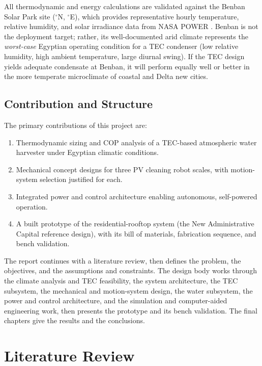 \documentclass[12pt,a4paper]{report}   %
\begin{document}
All thermodynamic and energy calculations are validated against the Benban Solar Park site
(\BenbanLat$^\circ$N, \BenbanLon$^\circ$E), which provides representative hourly temperature,
relative humidity, and solar irradiance data from NASA POWER \cite{nasa_power}. Benban is not the
deployment target; rather, its well-documented arid climate represents the \emph{worst-case}
Egyptian operating condition for a TEC condenser (low relative humidity, high ambient temperature,
large diurnal swing). If the TEC design yields adequate condensate at Benban, it will perform
equally well or better in the more temperate microclimate of coastal and Delta new cities.

\section{Contribution and Structure}

The primary contributions of this project are:
\begin{enumerate}[leftmargin=*]
  \item Thermodynamic sizing and COP analysis of a TEC-based atmospheric water harvester under
  Egyptian climatic conditions.
  \item Mechanical concept designs for three PV cleaning robot scales, with motion-system
  selection justified for each.
  \item Integrated power and control architecture enabling autonomous, self-powered operation.
  \item A built prototype of the residential-rooftop system (the New Administrative Capital
  reference design), with its bill of materials, fabrication sequence, and bench validation.
\end{enumerate}

The report continues with a literature review, then defines the problem, the objectives,
and the assumptions and constraints. The design body works through the climate analysis
and TEC feasibility, the system architecture, the TEC subsystem, the mechanical and
motion-system design, the water subsystem, the power and control architecture, and the
simulation and computer-aided engineering work, then presents the prototype and its
bench validation. The final chapters give the results and the conclusions.

\chapter{Literature Review}
\end{document}
